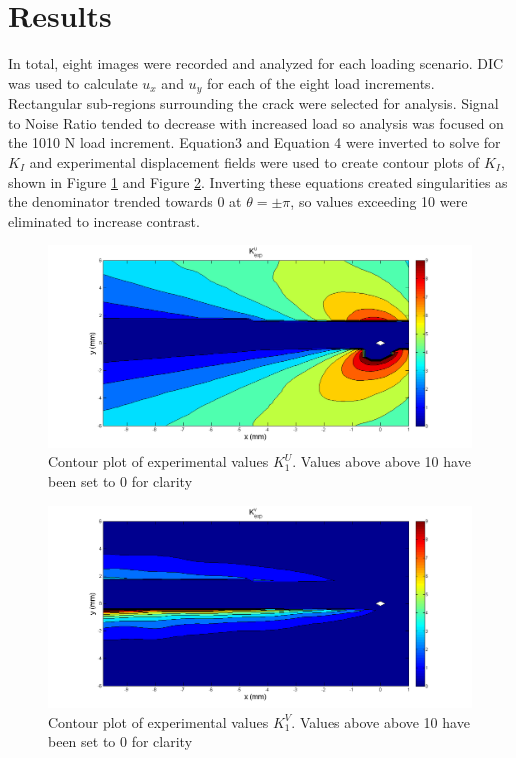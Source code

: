 \documentclass[12pt]{article}
\begin{document}
\section{Results}%
In total, eight images were recorded and analyzed for each loading scenario. DIC was used to calculate $u_x$ and $u_y$ for each of the eight load increments. Rectangular sub-regions surrounding the crack were selected for analysis. Signal to Noise Ratio tended to decrease with increased load so analysis was focused on the 1010 N load increment. Equation3 and Equation 4 were inverted to solve for $K_I$ and experimental displacement fields were used to create contour plots of $K_I$, shown in Figure \ref{fig:kU} and Figure \ref{fig:kV}. Inverting these equations created singularities as the denominator trended towards 0 at $\theta = \pm \pi$, so values exceeding 10 were eliminated to increase contrast. 

\begin{figure}[H]
	\centering
	\includegraphics[width=1\textwidth]{K_U_T.png}
	\caption{Contour plot of experimental values $K_1^U$.  Values above above 10 have been set to 0 for clarity}
	\label{fig:kU}
\end{figure}

\begin{figure}[H]
	\centering
	\includegraphics[width=1\textwidth]{K_V_T.png}
	\caption{Contour plot of experimental values $K_1^V$. Values above above 10 have been set to 0 for clarity}
	\label{fig:kV}
\end{figure}
\end{document}
